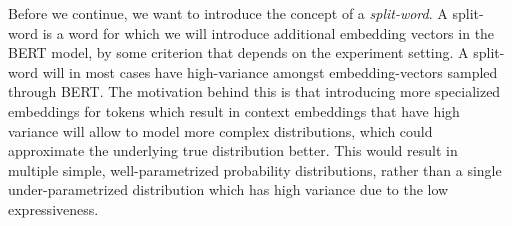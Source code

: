 \documentclass[a4paper,12pt,twoside,openright]{report}
\begin{document}
Before we continue, we want to introduce the concept of a \textit{split-word}. A split-word is a word for which we will introduce additional embedding vectors in the BERT model, by some criterion that depends on the experiment setting.
A split-word will in most cases have high-variance amongst embedding-vectors sampled through BERT.
The motivation behind this is that introducing more specialized embeddings for tokens which result in context embeddings that have high variance will allow to model more complex distributions, which could approximate the underlying true distribution better.
This would result in multiple simple, well-parametrized probability distributions, rather than a single under-parametrized distribution which has high variance due to the low expressiveness.

\end{document}
